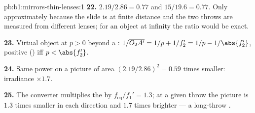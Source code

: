 \begin{solution}{pb:b1:mirrors-thin-lenses:1}
\textbf{22.} $2.19/2.86 = 0.77$ and $15/19.6 = 0.77$. Only approximately
because the slide is at finite distance and the two throws are measured
from different lenses; for an object at infinity the ratio would be
exact.

\textbf{23.} Virtual object at $p > 0$ beyond a :
$1/\overline{O_2A'} = 1/p + 1/f_2' = 1/p - 1/\abs{f_2'}$, positive () iff $p < \abs{f_2'}$.

\textbf{24.} Same power on a picture of area $(2.19/2.86)^2 = 0.59$
times smaller: irradiance $\times 1.7$.

\textbf{25.} The converter multiplies the  by
$f_{\mathrm{eq}}/f_1' = 1.3$; at a given throw the picture is $1.3$
times smaller in each direction and $1.7$ times brighter --- a
long-throw .
\end{solution}
